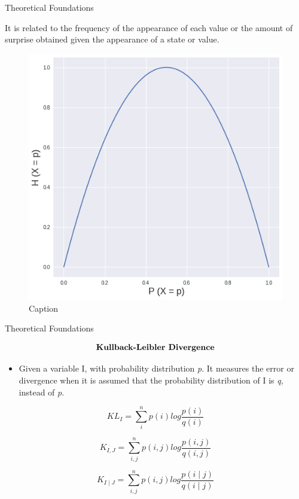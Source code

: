 \begin{frame}{{Theoretical Foundations}}

It is related to the frequency of the appearance of each value or the amount of surprise obtained given the appearance of a state or value.

\begin{figure}
    \centering
    \includegraphics[scale=0.3]{figuras/entropy.png}
    \caption{Caption}
    \label{fig:my_label}
\end{figure}
\end{frame}

\begin{frame}[allowframebreaks]{{Theoretical Foundations}}

\begin{align*}
   \centering \textbf{Kullback-Leibler Divergence}
\end{align*}

\begin{itemize}
    \item Given  a variable I, with probability distribution \textit{p}. It measures the error or divergence when it is assumed that the probability distribution of I is \textit{q}, instead of \textit{p}.
\end{itemize}

\begin{equation}
\label{eq:kullback}   
    KL_{I} = \sum_{i}^{n}p(i)log \frac{p(i)}{q(i)}
\end{equation}

\begin{equation}
\label{eq:kullback_joint}   
    K_{I, J} = \sum_{i,j}^{n}p(i,j)log \frac{p(i,j)}{q(i,j)}
\end{equation}


\begin{equation}
\label{eq:kullback_cond}   
    K_{I \mid J} = \sum_{i,j}^{n}p(i,j)log \frac{p(i\mid j)}{q(i \mid j)}
\end{equation}


\end{frame}

